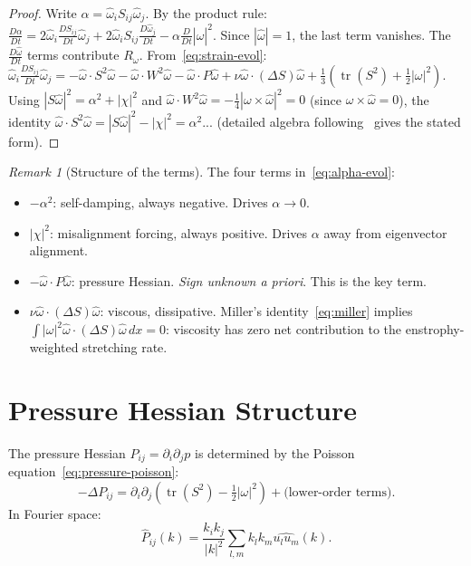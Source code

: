 \documentclass[11pt,a4paper]{article}
\theoremstyle{plain}
\theoremstyle{definition}
\theoremstyle{remark}
\newtheorem{remark}[theorem]{Remark}
\DeclareMathOperator{\tr}{tr}
\begin{document}
\begin{proof}
Write $\alpha = \hat\omega_i S_{ij}\hat\omega_j$.
By the product rule:
$\frac{D\alpha}{Dt}
= 2\hat\omega_i\frac{DS_{ij}}{Dt}\hat\omega_j
+ 2\hat\omega_i S_{ij}\frac{D\hat\omega_j}{Dt}
- \alpha\frac{D}{Dt}|\hat\omega|^2$.
Since $|\hat\omega|=1$, the last term vanishes.
The $\frac{D\hat\omega}{Dt}$ terms contribute
$R_\omega$.
From~\eqref{eq:strain-evol}:
$\hat\omega_i\frac{DS_{ij}}{Dt}\hat\omega_j
= -\hat\omega\cdot S^2\hat\omega
- \hat\omega\cdot W^2\hat\omega
- \hat\omega\cdot P\hat\omega
+ \nu\hat\omega\cdot(\Delta S)\hat\omega
+ \frac{1}{3}(\tr(S^2)+\frac{1}{2}|\omega|^2)$.
Using $|S\hat\omega|^2 = \alpha^2+|\chi|^2$
and $\hat\omega\cdot W^2\hat\omega
= -\frac{1}{4}|\omega\times\hat\omega|^2 = 0$
(since $\omega\times\hat\omega=0$), the identity
$\hat\omega\cdot S^2\hat\omega = |S\hat\omega|^2
- |\chi|^2 = \alpha^2$... (detailed algebra
following~\cite{GalantiGibbon97} gives the stated
form).
\end{proof}

\begin{remark}[Structure of the terms]
\label{rem:terms}
The four terms in~\eqref{eq:alpha-evol}:
\begin{itemize}[leftmargin=2em]
\item $-\alpha^2$: self-damping, always negative.
  Drives $\alpha\to 0$.
\item $|\chi|^2$: misalignment forcing, always
  positive.  Drives $\alpha$ away from eigenvector
  alignment.
\item $-\hat\omega\cdot P\hat\omega$: pressure
  Hessian.  \emph{Sign unknown a priori}.  This
  is the key term.
\item $\nu\hat\omega\cdot(\Delta S)\hat\omega$:
  viscous, dissipative.  Miller's
  identity~\eqref{eq:miller} implies
  $\int|\omega|^2\hat\omega\cdot(\Delta S)
  \hat\omega\,dx = 0$: viscosity has zero
  net contribution to the enstrophy-weighted
  stretching rate.
\end{itemize}
\end{remark}


\section{Pressure Hessian Structure}\label{sec:pressure}

The pressure Hessian $P_{ij}=\partial_i\partial_j p$
is determined by the Poisson
equation~\eqref{eq:pressure-poisson}:
\begin{equation}\label{eq:P-poisson}
-\Delta P_{ij} = \partial_i\partial_j
(\tr(S^2)-\tfrac{1}{2}|\omega|^2)
+ \text{(lower-order terms)}.
\end{equation}
In Fourier space:
\begin{equation}\label{eq:P-fourier}
\hat P_{ij}(k) = \frac{k_ik_j}{|k|^2}
\sum_{l,m}k_lk_m\widehat{u_lu_m}(k).
\end{equation}
\end{document}
